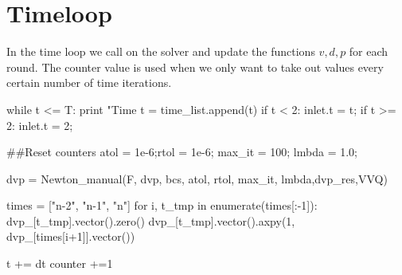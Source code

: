 \section{Timeloop}
In the time loop we call on the solver and update the functions $ v,d,p$ for each round. The counter value is used when we only want to take out values every certain number of time iterations.

\begin{python}

while t <= T:
    print "Time t = %
    time_list.append(t)
    if t < 2:
        inlet.t = t;
    if t >= 2:
        inlet.t = 2;

    ##Reset counters
    atol = 1e-6;rtol = 1e-6; max_it = 100; lmbda = 1.0;

    dvp = Newton_manual(F, dvp, bcs, atol, rtol, max_it, lmbda,dvp_res,VVQ)


    times = ["n-2", "n-1", "n"]
    for i, t_tmp in enumerate(times[:-1]):
   	dvp_[t_tmp].vector().zero()
    	dvp_[t_tmp].vector().axpy(1, dvp_[times[i+1]].vector())

    t += dt
    counter +=1
\end{python}



	